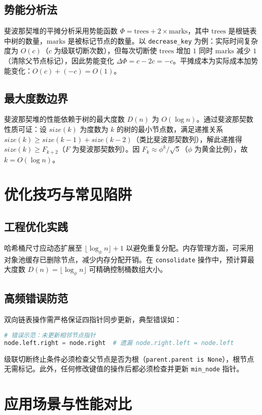 \section{势能分析法}
斐波那契堆的平摊分析采用势能函数 $\Phi = \text{trees} + 2 \times \text{marks}$，其中 $\text{trees}$ 是根链表中树的数量，$\text{marks}$ 是被标记节点的数量。以 \texttt{decrease\_{}key} 为例：实际时间复杂度为 $O(c)$（$c$ 为级联切断次数），但每次切断使 $\text{trees}$ 增加 $1$ 同时 $\text{marks}$ 减少 $1$（清除父节点标记），因此势能变化 $\Delta\Phi = c - 2c = -c$。平摊成本为实际成本加势能变化：$O(c) + (-c) = O(1)$。\par
\section{最大度数边界}
斐波那契堆的性能依赖于树的最大度数 $D(n)$ 为 $O(\log n)$。通过斐波那契数性质可证：设 $size(k)$ 为度数为 $k$ 的树的最小节点数，满足递推关系 $size(k) \geq size(k-1) + size(k-2)$（类比斐波那契数列），解此递推得 $size(k) \geq F_{k+2}$（$F$ 为斐波那契数列）。因 $F_k \approx \phi^k / \sqrt{5}$（$\phi$ 为黄金比例），故 $k = O(\log n)$。\par
\chapter{优化技巧与常见陷阱}
\section{工程优化实践}
哈希桶尺寸应动态扩展至 $\lfloor \log_\phi n \rfloor + 1$ 以避免重复分配。内存管理方面，可采用对象池缓存已删除节点，减少内存分配开销。在 \texttt{consolidate} 操作中，预计算最大度数 $D(n) = \lfloor \log_\phi n \rfloor$ 可精确控制桶数组大小。\par
\section{高频错误防范}
双向链表操作需严格保证四指针同步更新，典型错误如：\par
\begin{lstlisting}[language=python]
# 错误示范：未更新相邻节点指针
node.left.right = node.right  # 遗漏 node.right.left = node.left
\end{lstlisting}
级联切断终止条件必须检查父节点是否为根（\texttt{parent.parent is None}），根节点无需标记。此外，任何修改键值的操作后都必须检查并更新 \texttt{min\_{}node} 指针。\par
\chapter{应用场景与性能对比}
